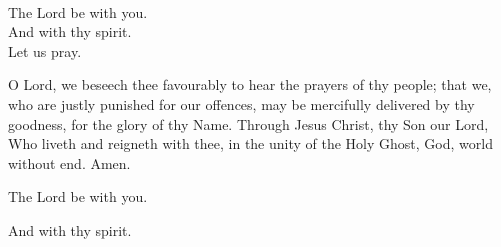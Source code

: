 \\
  \rubric{\Vbar}The Lord be with you.
\\
  \rubric{\Rbar}And with thy spirit.
\\
Let us pray.

O Lord, we beseech thee favourably to hear the prayers of thy people; that we, who are justly punished for our offences, may be mercifully delivered by thy goodness, for the glory of thy Name. Through Jesus Christ, thy Son our Lord, Who liveth and reigneth with thee, in the unity of the Holy Ghost, God, world without end.\rubric{\Rbar} Amen.

  \rubric{\Vbar}The Lord be with you.

  \rubric{\Rbar}And with thy spirit.
